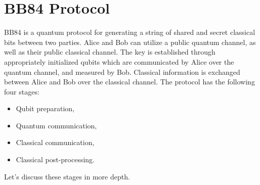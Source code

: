 \section{BB84 Protocol}
\label{sec:bb84-protocol}

BB84 is a quantum protocol for generating a string of shared and secret classical bits between two parties.
Alice and Bob can utilize a public quantum channel, as well as their public classical channel.
The key is established through appropriately initialized qubits which are communicated by Alice over the quantum channel, and measured by Bob.
Classical information is exchanged between Alice and Bob over the classical channel.
The protocol has the following four stages:
\begin{itemize}
    \item Qubit preparation,
    \item Quantum communication,
    \item Classical communication,
    \item Classical post-processing.
\end{itemize}
Let's discuss these stages in more depth.

